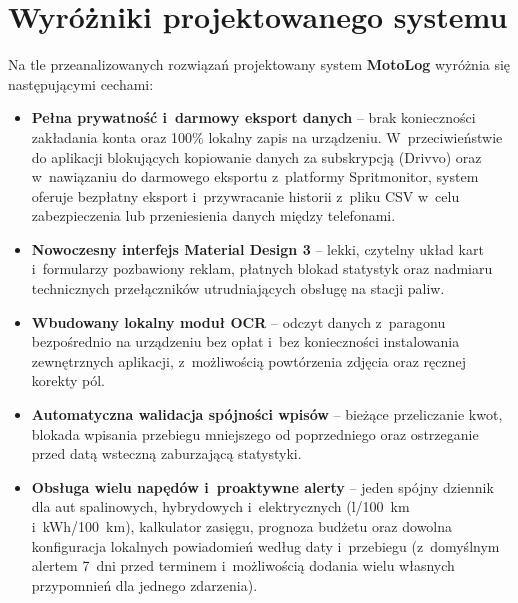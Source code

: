\section{Wyróżniki projektowanego systemu}
\label{sec:wyrozniki_systemu}

Na tle przeanalizowanych rozwiązań projektowany system \textbf{MotoLog} wyróżnia się następującymi cechami:

\begin{itemize}
    \item \textbf{Pełna prywatność i~darmowy eksport danych} -- brak konieczności zakładania konta oraz 100\% lokalny zapis na urządzeniu. W~przeciwieństwie do aplikacji blokujących kopiowanie danych za subskrypcją (Drivvo) oraz w~nawiązaniu do darmowego eksportu z~platformy Spritmonitor, system oferuje bezpłatny eksport i~przywracanie historii z~pliku CSV w~celu zabezpieczenia lub przeniesienia danych między telefonami.
    \item \textbf{Nowoczesny interfejs Material Design 3} -- lekki, czytelny układ kart i~formularzy pozbawiony reklam, płatnych blokad statystyk oraz nadmiaru technicznych przełączników utrudniających obsługę na stacji paliw.
    \item \textbf{Wbudowany lokalny moduł OCR} -- odczyt danych z~paragonu bezpośrednio na urządzeniu bez opłat i~bez konieczności instalowania zewnętrznych aplikacji, z~możliwością powtórzenia zdjęcia oraz ręcznej korekty pól.
    \item \textbf{Automatyczna walidacja spójności wpisów} -- bieżące przeliczanie kwot, blokada wpisania przebiegu mniejszego od poprzedniego oraz ostrzeganie przed datą wsteczną zaburzającą statystyki.
    \item \textbf{Obsługa wielu napędów i~proaktywne alerty} -- jeden spójny dziennik dla aut spalinowych, hybrydowych i~elektrycznych (l/100~km i~kWh/100~km), kalkulator zasięgu, prognoza budżetu oraz dowolna konfiguracja lokalnych powiadomień według daty i~przebiegu (z~domyślnym alertem 7~dni przed terminem i~możliwością dodania wielu własnych przypomnień dla jednego zdarzenia).
\end{itemize}